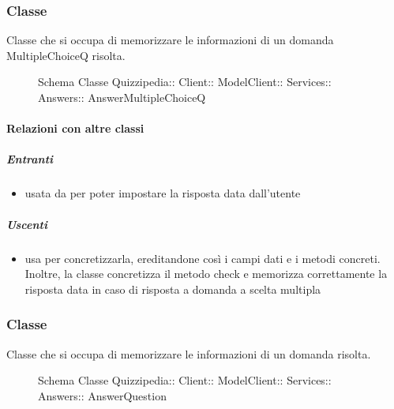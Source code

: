 \subsubsection{Classe }
Classe che si occupa di memorizzare le informazioni di un domanda MultipleChoiceQ risolta.
\begin{figure}[H]
\centering
\noindent{}
\caption[Schema Classe AnswerMultipleChoiceQ]{Schema Classe Quizzipedia:: Client:: ModelClient:: Services:: Answers:: AnswerMultipleChoiceQ}
\end{figure}
\paragraph{Relazioni con altre classi}
\subparagraph{Entranti}
\begin{itemize}
\item usata da  per poter impostare la risposta data dall'utente
\end{itemize}
\subparagraph{Uscenti}
\begin{itemize}
\item usa  per concretizzarla, ereditandone così i campi dati e i metodi concreti. Inoltre, la classe concretizza il metodo check e memorizza correttamente la risposta data in caso di risposta a domanda a scelta multipla
\end{itemize}
\subsubsection{Classe }
Classe che si occupa di memorizzare le informazioni di un domanda risolta.
\begin{figure}[H]
\centering
\noindent{}
\caption[Schema Classe AnswerQuestion]{Schema Classe Quizzipedia:: Client:: ModelClient:: Services:: Answers:: AnswerQuestion}
\end{figure}
